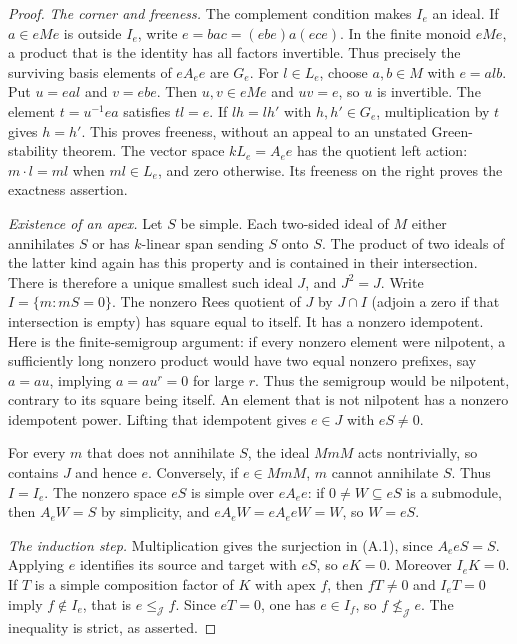 \begin{proof}
\emph{The corner and freeness.}
The complement condition makes $I_e$ an ideal. If $a\in eMe$ is outside
$I_e$, write $e=b a c=(ebe)a(ece)$. In the finite monoid $eMe$, a product
that is the identity has all factors invertible. Thus precisely the surviving
basis elements of $eA_ee$ are $G_e$.
For $l\in L_e$, choose $a,b\in M$ with $e=a l b$. Put $u=eal$ and $v=ebe$.
Then $u,v\in eMe$ and $uv=e$, so $u$ is invertible. The element
$t=u^{-1}ea$ satisfies $tl=e$. If $lh=lh'$ with $h,h'\in G_e$, multiplication
by $t$ gives $h=h'$. This proves freeness, without an appeal to an unstated
Green-stability theorem. The vector space $kL_e=A_ee$ has the quotient left
action: $m\cdot l=ml$ when $ml\in L_e$, and zero otherwise. Its freeness
on the right proves the exactness assertion.

\emph{Existence of an apex.}
Let $S$ be simple. Each two-sided ideal of $M$ either annihilates $S$ or has
$k$-linear span sending $S$ onto $S$. The product of two ideals of the latter
kind again has this property and is contained in their intersection.
There is therefore a unique smallest such ideal $J$, and $J^2=J$.
Write $I=\{m:mS=0\}$. The nonzero Rees quotient of $J$ by $J\cap I$
(adjoin a zero if that intersection is empty) has square equal to itself.
It has a nonzero idempotent. Here is the finite-semigroup argument: if every
nonzero element were nilpotent, a sufficiently long nonzero product would
have two equal nonzero prefixes, say $a=au$, implying $a=au^r=0$ for large
$r$. Thus the semigroup would be nilpotent, contrary to its square being
itself. An element that is not nilpotent has a nonzero idempotent power.
Lifting that idempotent gives $e\in J$ with $eS\ne0$.

For every $m$ that does not annihilate $S$, the ideal $MmM$ acts nontrivially,
so contains $J$ and hence $e$. Conversely, if $e\in MmM$, $m$ cannot annihilate
$S$. Thus $I=I_e$. The nonzero space $eS$ is simple over $eA_ee$: if
$0\ne W\subseteq eS$ is a submodule, then $A_eW=S$ by simplicity, and
$eA_eW=eA_eeW=W$, so $W=eS$.

\emph{The induction step.}
Multiplication gives the surjection in (A.1), since $A_eeS=S$.
Applying $e$ identifies its source and target with $eS$, so $eK=0$.
Moreover $I_eK=0$. If $T$ is a simple composition factor of $K$ with apex
$f$, then $fT\ne0$ and $I_eT=0$ imply $f\notin I_e$, that is
$e\leq_{\mathcal J}f$. Since $eT=0$, one has $e\in I_f$, so
$f\not\leq_{\mathcal J}e$. The inequality is strict, as asserted.
\end{proof}

